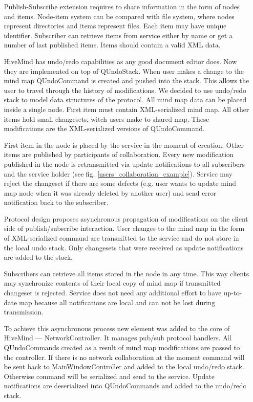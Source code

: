  Publish-Subscribe extension requires to share information in the form of nodes
 and items. Node-item system can be compared with file system, where nodes
 represent directories and items represent files. Each item may have unique
 identifier. Subscriber can retrieve items from service either by name or get a
 number of last published items. Items should contain a valid XML data.

 HiveMind has undo/redo capabilities as any good document editor does. Now they
 are implemented on top of QUndoStack. When user makes a change to the mind map
 QUndoCommand is created and pushed into the stack. This allows the user to
 travel through the history of modifications. We decided to use undo/redo stack
 to model data structures of the protocol. All mind map data can be placed
 inside a single node. First item must contain XML-serialized mind map. All other
 items hold small changesets, witch users make to shared map. These modifications
 are the XML-serialized versions of QUndoCommand.

 First item in the node is placed by the service in the moment of creation. Other
 items are published by participants of collaboration. Every new modification
 published in the node is retransmitted via update notifications to all
 subscribers and the service holder (see fig. \ref{users_collaboration_example}). 
 Service may reject the changeset if there are some defects (e.g. user wants to 
 update mind map node when it was already deleted by another user) and send error
 notification back to the subscriber.

 Protocol design proposes asynchronous propagation of modifications on the client
 side of publish/subscribe interaction. User changes to the mind map in the form
 of XML-serialized command are transmitted to the service and do not store in
 the local undo stack. Only changesets that were received as update notifications
 are added to the stack.

 Subscribers can retrieve all items stored in the node in any time. This
 way clients may synchronize contents of their local copy of mind map if
 transmitted changeset is rejected. Service does not need any additional effort
 to have up-to-date map because all notifications are local and can not be lost
 during transmission.

 To achieve this asynchronous process new element was added to the core of
 HiveMind --- NetworkController. It manages pub/sub protocol handlers. All
 QUndoCommands created as a result of mind map modifications are passed to the
 controller. If there is no network collaboration at the moment command will be
 sent back to MainWindowController and added to the local undo/redo stack.
 Otherwise command will be serialized and send to the service. Update
 notifications are deserialized into QUndoCommands and added to the undo/redo
 stack.

